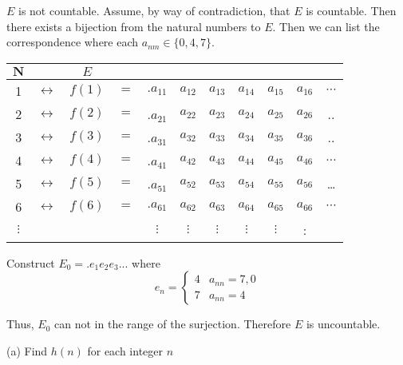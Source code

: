 \documentclass{report}
\begin{document}
\sol 
\begin{myproof}
  $E$ is not countable. Assume, by way of contradiction, that $E$ is countable.  Then there exists a bijection from the natural numbers to $E.$ Then we can list the correspondence where each $a_{nm} \in \{0,4,7\}.$

 \begin{centering}
     
\begin{tabular}{c c c c c c c c c c c}
 $\mathbf{N}$ & & $E$ & & & & & & & & \\
\hline 1 & $\longleftrightarrow$ & $f(1)$ & $=$ & $.a_{11}$ & $a_{12}$ & $a_{13}$ & $a_{14}$ & $a_{15}$ & $a_{16}$ & $\cdots$ \\
 2 & $\longleftrightarrow$ & $f(2)$ & $=$ &.$a_{21}$ & $a_{22}$ & $a_{23}$ & $a_{24}$ & $a_{25}$ & $a_{26}$ & .. \\
 3 & $\longleftrightarrow$ & $f(3)$ & $=$ &.$a_{31}$ & $a_{32}$ & $a_{33}$ & $a_{34}$ & $a_{35}$ & $a_{36}$ & .. \\
 4 & $\longleftrightarrow$ & $f(4)$ & $=$ &.$a_{41}$ & $a_{42}$ & $a_{43}$ & $a_{44}$ & $a_{45}$ & $a_{46}$ & $\ldots$ \\
 5 & $\longleftrightarrow$ & $f(5)$ & $=$ &.$a_{51}$ & $a_{52}$ & $a_{53}$ & $a_{54}$ & $a_{55}$ & $a_{56}$ & \dots \\
 6 & $\longleftrightarrow$ & $f(6)$ & $=$ & $.a_{61}$ & $a_{62}$ & $a_{63}$ & $a_{64}$ & $a_{65}$ & $a_{66}$ & $\cdots$ \\
$\vdots$ & & & & $\vdots$ & $\vdots$ & $\vdots$ & $\vdots$ & $\vdots$ & : & \\

\end{tabular}
\end{centering}   

Construct $E_0 = .e_1e_2e_3...$ where 
$$e_n =  \begin{cases} 
  4 &  a_{nn} = 7, 0\\
  7 & a_{nn} = 4
   \end{cases}
   $$

Thus, $E_0$ can not in the range of the surjection. Therefore $E$ is uncountable.
    
\end{myproof}

\bigskip
(a) Find $h(n)$ for each integer $n$
\end{document}
